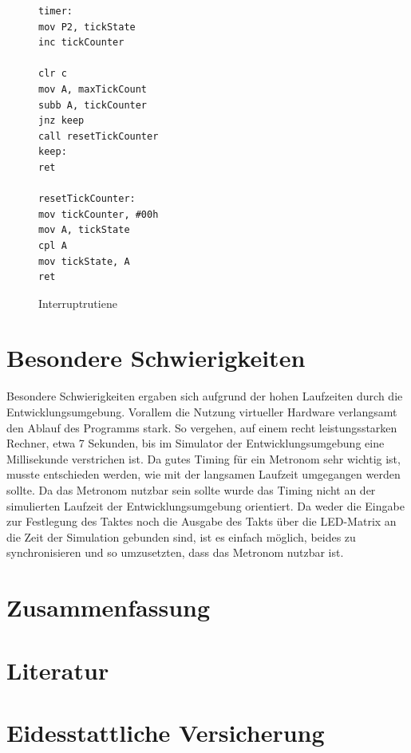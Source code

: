 \documentclass[a4paper, 12pt]{scrartcl}
\begin{document}
\begin{figure}
\begin{lstlisting}
timer:
mov P2, tickState	
inc tickCounter		

clr c
mov A, maxTickCount
subb A, tickCounter	
jnz keep
call resetTickCounter	
keep:
ret

resetTickCounter:
mov tickCounter, #00h	
mov A, tickState	
cpl A
mov tickState, A
ret
\end{lstlisting}
\caption{Interruptrutiene}
\label{lst:timer}
\end{figure}

\section{Besondere Schwierigkeiten}
Besondere Schwierigkeiten ergaben sich aufgrund der hohen Laufzeiten durch die Entwicklungsumgebung. Vorallem die Nutzung virtueller Hardware verlangsamt den Ablauf des Programms stark. So vergehen, auf einem recht leistungsstarken Rechner, etwa 7 Sekunden, bis im Simulator der Entwicklungsumgebung eine Millisekunde verstrichen ist. Da gutes Timing für ein Metronom sehr wichtig ist, musste entschieden werden, wie mit der langsamen Laufzeit umgegangen werden sollte. Da das Metronom nutzbar sein sollte wurde das Timing nicht an der simulierten Laufzeit der Entwicklungsumgebung orientiert. Da weder die Eingabe zur Festlegung des Taktes noch die Ausgabe des Takts über die LED-Matrix an die Zeit der Simulation gebunden sind, ist es einfach möglich, beides zu synchronisieren und so umzusetzten, dass das Metronom nutzbar ist.
\\

\section{Zusammenfassung}

\section{Literatur}
\section{Eidesstattliche Versicherung}
\end{document}
